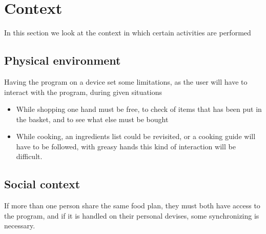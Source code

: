 \section{Context}
In this section we look at the context in which certain activities are performed
\subsection{Physical environment}
Having the program on a device set some limitations, as the user will have to interact with the program, during given situations
\begin{itemize}
\item While shopping one hand must be free, to check of items that has been put in the basket, and to see what else must be bought
\item While cooking, an ingredients list could be revisited, or a cooking guide will have to be followed, with greasy hands this kind of interaction will be difficult.
\end{itemize}
\subsection{Social context}
\begin{itemize}
If more than one person share the same food plan, they must both have access to the program, and if it is handled on their personal devises, some synchronizing is necessary.
\end{itemize}
